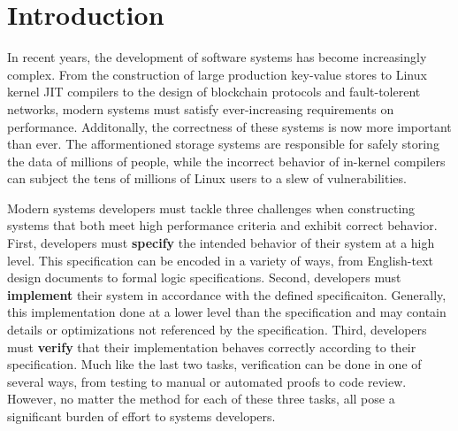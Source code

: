 \chapter{Introduction}

In recent years, the development of software systems has become increasingly
complex.
From the construction of large production key-value stores to Linux kernel JIT compilers
to the design of blockchain protocols and fault-tolerent networks,
modern systems must satisfy ever-increasing requirements on performance.
Additonally, the
correctness of these systems is now more important than ever. The
afformentioned storage systems are responsible for safely storing the data
of millions of people, while
the incorrect behavior of in-kernel compilers can subject the tens of millions of
Linux users to a slew of vulnerabilities.

Modern systems developers must tackle three challenges when constructing
systems that both meet high performance criteria and exhibit correct behavior.
First, developers must \textbf{specify} the intended behavior of their system at a high
level. This specification can be encoded in a variety of ways, from
English-text design documents to formal logic specifications.
Second, developers must \textbf{implement} their system in accordance with the defined
specificaiton. Generally, this implementation done at a lower level than the
specification and may contain details or optimizations not referenced by the specification.
Third, developers must \textbf{verify} that their implementation behaves correctly 
according to their specification. Much like the last two tasks, verification can be done
in one of several ways, from testing to manual or automated proofs to code review.
However, no matter the method for each of these three tasks,
all pose a significant burden of effort to systems developers.


